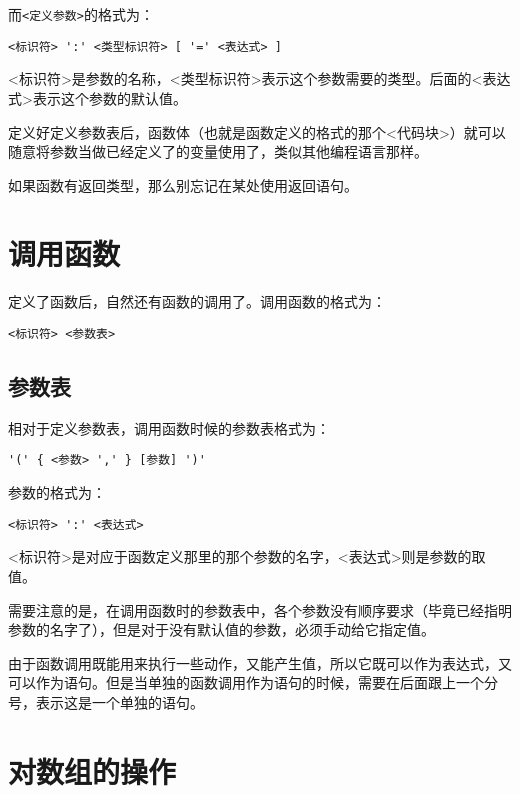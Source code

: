 而\verb|<定义参数>|的格式为：

\begin{verbatim}
<标识符> ':' <类型标识符> [ '=' <表达式> ]
\end{verbatim}

<标识符>是参数的名称，<类型标识符>表示这个参数需要的类型。后面的<表达式>表示这个参数的默认值。

定义好定义参数表后，函数体（也就是函数定义的格式的那个<代码块>）就可以随意将参数当做已经定义了的变量使用了，类似其他编程语言那样。

如果函数有返回类型，那么别忘记在某处使用返回语句。

\section{调用函数}

定义了函数后，自然还有函数的调用了。调用函数的格式为：

\begin{verbatim}
<标识符> <参数表>
\end{verbatim}

\subsection{参数表}

相对于定义参数表，调用函数时候的参数表格式为：

\begin{verbatim}
'(' { <参数> ',' } [参数] ')'
\end{verbatim}

参数的格式为：

\begin{verbatim}
<标识符> ':' <表达式>
\end{verbatim}

<标识符>是对应于函数定义那里的那个参数的名字，<表达式>则是参数的取值。

需要注意的是，在调用函数时的参数表中，各个参数没有顺序要求（毕竟已经指明参数的名字了），但是对于没有默认值的参数，必须手动给它指定值。

由于函数调用既能用来执行一些动作，又能产生值，所以它既可以作为表达式，又可以作为语句。但是当单独的函数调用作为语句的时候，需要在后面跟上一个分号，表示这是一个单独的语句。

\section{对数组的操作}

